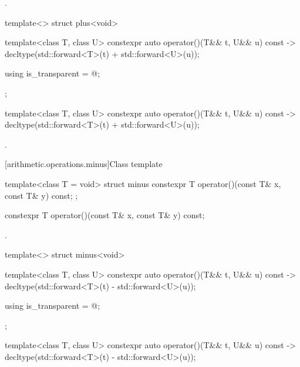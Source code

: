 \begin{itemdescr}
\pnum
\returns
{}.
\end{itemdescr}

%
\begin{itemdecl}
template<> struct plus<void> {
  template<class T, class U> constexpr auto operator()(T&& t, U&& u) const
    -> decltype(std::forward<T>(t) + std::forward<U>(u));

  using is_transparent = @\unspec@;
};
\end{itemdecl}

%
\begin{itemdecl}
template<class T, class U> constexpr auto operator()(T&& t, U&& u) const
  -> decltype(std::forward<T>(t) + std::forward<U>(u));
\end{itemdecl}

\begin{itemdescr}
\pnum
\returns
{}.
\end{itemdescr}

[arithmetic.operations.minus]{Class template }

%
\begin{itemdecl}
template<class T = void> struct minus {
  constexpr T operator()(const T& x, const T& y) const;
};
\end{itemdecl}

%
\begin{itemdecl}
constexpr T operator()(const T& x, const T& y) const;
\end{itemdecl}

\begin{itemdescr}
\pnum
\returns
{}.
\end{itemdescr}

%
\begin{itemdecl}
template<> struct minus<void> {
  template<class T, class U> constexpr auto operator()(T&& t, U&& u) const
    -> decltype(std::forward<T>(t) - std::forward<U>(u));

  using is_transparent = @\unspec@;
};
\end{itemdecl}

%
\begin{itemdecl}
template<class T, class U> constexpr auto operator()(T&& t, U&& u) const
  -> decltype(std::forward<T>(t) - std::forward<U>(u));
\end{itemdecl}

